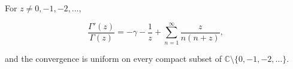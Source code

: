 For $z \neq 0, -1, -2, \ldots$,

$$\frac{\Gamma'(z)}{\Gamma(z)} = -\gamma - \frac{1}{z} + \sum_{n=1}^{\infty} \frac{z}{n(n+z)},$$

and the convergence is uniform on every compact subset of $\mathbb{C} \setminus \{0, -1, -2, \ldots\}$.
